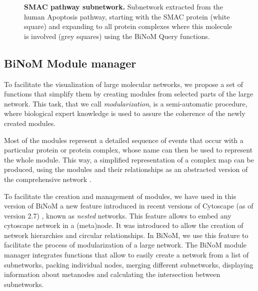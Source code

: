 \documentclass[10pt]{bmc_article}
\newenvironment{bmcformat}{\baselineskip20pt\sloppy\setboolean{publ}{false}}{\baselineskip20pt\sloppy}
\begin{document}
\begin{bmcformat}
\begin{figure}[h]
 \caption{\label{smaccomplexes}  \textbf{SMAC pathway subnetwork.}
      Subnetwork extracted from the human Apoptosis pathway, starting with the
SMAC protein (white square) and expanding to all protein complexes where this
molecule is involved (grey squares) using the BiNoM Query functions.}
\end{figure}

\subsection*{BiNoM Module manager}

To facilitate the visualization of large molecular networks, we propose a set of
functions that simplify them by creating modules from selected parts of the
large network. This task, that we call \emph{modularization}, is a
semi-automatic procedure, where biological expert knowledge is used to assure
the coherence of the newly created modules.

Most of the modules represent a detailed
sequence of events that occur with a particular protein or protein complex,
whose name can then be used to represent the whole module. This way, a
simplified representation of a complex map can be produced, using the modules
and their relationships as an abstracted version of the comprehensive network
\cite{calzone2008comprehensive}.

To facilitate the creation and management of modules, we have used in this
version of BiNoM a new feature introduced in recent versions of Cytoscape (as of
version 2.7) \cite{cline2007integration}, known as \emph{nested} networks. This
feature allows to embed any cytoscape network in a (meta)node. It was
introduced to allow the creation of network hierarchies and circular
relationships. In BiNoM, we use this feature to facilitate the process of
modularization of a large network. The BiNoM module manager integrates
functions that allow to easily create a network from a list of subnetworks,
packing individual nodes, merging different subnetworks, displaying information
about metanodes and calculating the intersection between subnetworks.


\end{bmcformat}
\end{document}

